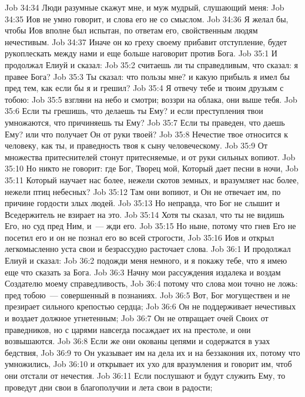 \vs Job 34:34 Люди разумные скажут мне, и муж мудрый, слушающий меня:
\vs Job 34:35 Иов не умно говорит, и слова его не со смыслом.
\vs Job 34:36 Я желал бы, чтобы Иов вполне был испытан, по ответам его, свойственным людям нечестивым.
\vs Job 34:37 Иначе он ко греху своему прибавит отступление, будет рукоплескать между нами и еще больше наговорит против Бога.
\vs Job 35:1 И продолжал Елиуй и сказал:
\vs Job 35:2 считаешь ли ты справедливым, что сказал: я правее Бога?
\vs Job 35:3 Ты сказал: что пользы мне? и какую прибыль я имел бы пред тем, как если бы я и грешил?
\vs Job 35:4 Я отвечу тебе и твоим друзьям с тобою:
\vs Job 35:5 взгляни на небо и смотри; воззри на облака, они выше тебя.
\vs Job 35:6 Если ты грешишь, что делаешь ты Ему? и если преступления твои умножаются, что причиняешь ты Ему?
\vs Job 35:7 Если ты праведен, что даешь Ему? или что получает Он от руки твоей?
\vs Job 35:8 Нечестие твое относится к человеку, как ты, и праведность твоя к сыну человеческому.
\vs Job 35:9 От множества притеснителей стонут притесняемые, и от руки сильных вопиют.
\vs Job 35:10 Но никто не говорит: где Бог, Творец мой, Который дает песни в ночи,
\vs Job 35:11 Который научает нас более, нежели скотов земных, и вразумляет нас более, нежели птиц небесных?
\vs Job 35:12 Там они вопиют, и Он не отвечает им, по причине гордости злых людей.
\vs Job 35:13 Но неправда, что Бог не слышит и Вседержитель не взирает на это.
\vs Job 35:14 Хотя ты сказал, что ты не видишь Его, но суд пред Ним, и~--- жди его.
\vs Job 35:15 Но ныне, потому что гнев Его не посетил его и он не познал его во всей строгости,
\vs Job 35:16 Иов и открыл легкомысленно уста свои и безрассудно расточает слова.
\vs Job 36:1 И продолжал Елиуй и сказал:
\vs Job 36:2 подожди меня немного, и я покажу тебе, что я имею еще что сказать за Бога.
\vs Job 36:3 Начну мои рассуждения издалека и воздам Создателю моему справедливость,
\vs Job 36:4 потому что слова мои точно не ложь: пред тобою~--- совершенный в познаниях.
\vs Job 36:5 Вот, Бог могуществен и не презирает сильного крепостью сердца;
\vs Job 36:6 Он не поддерживает нечестивых и воздает должное угнетенным;
\vs Job 36:7 Он не отвращает очей Своих от праведников, но с царями навсегда посаждает их на престоле, и они возвышаются.
\vs Job 36:8 Если же они окованы цепями и содержатся в узах бедствия,
\vs Job 36:9 то Он указывает им на дела их и на беззакония их, потому что умножились,
\vs Job 36:10 и открывает их ухо для вразумления и говорит им, чтоб они отстали от нечестия.
\vs Job 36:11 Если послушают и будут служить Ему, то проведут дни свои в благополучии и лета свои в радости;
